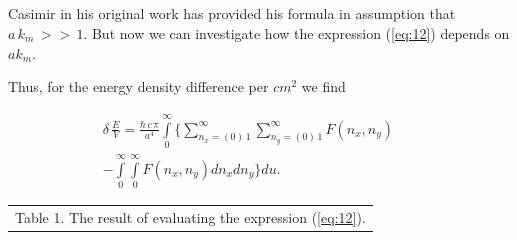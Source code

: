\documentclass[twoside, 10pt]{article}
\def\myvspacebeforesubsection{-2.0mm}
\def\myvspaceaftersubsection{-2.5mm}
\begin{document}
\begin{multicols}{2}


\vspace{\myvspacebeforesubsection}
    \subsection*{} \label{how-deltaleftevright-depends-on-a-k_m}
\vspace{\myvspaceaftersubsection}


    Casimir in his original work \cite{Casimir1948} has provided his formula in assumption that
\(a\,k_m\,>>\,1\). But now we can investigate how the expression (\ref{eq:12}) depends on \(a k_m\).


    Thus, for the energy density difference per \(cm^2\) we find

\vspace{-3.5mm}
\begin{equation}
\begin{array}{r}
    \delta\,\frac{E}{V} = \frac{\hbar\,c\,\pi}{a^4} \int\limits_{0}^{\infty} \Bigg\{ \sum\limits_{n_x=\left(0\right)\,1}^{\infty} \sum\limits_{n_y=\left(0\right)\,1}^{\infty} F\left(n_x, n_y\right) \,\,\,\,\,\,\,\,\,\,\\ 
- \int\limits_{0}^{\infty} \int\limits_{0}^{\infty} F\left(n_x, n_y\right) d{n_x} d{n_y} \Bigg\} d{u}.
\end{array}
\end{equation}

\vspace{-3.5mm}

\noindent
\begin{center}
\begin{tabular}{ r }
Table 1. The result of evaluating the expression (\ref{eq:12}).
\end{tabular}

\vspace{+3.5mm}


\end{center}
\end{multicols}
\end{document}
